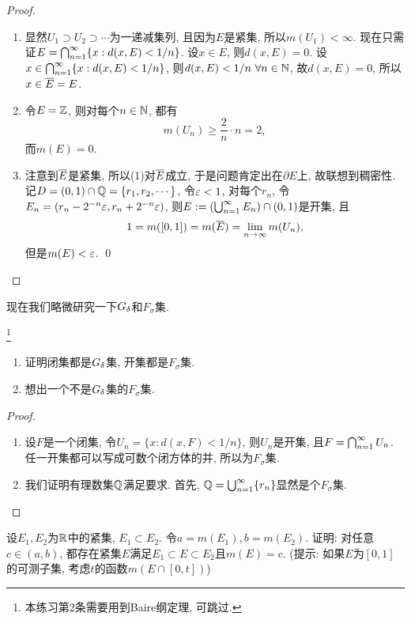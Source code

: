 \begin{proof}
    \begin{enumerate}
    \item 显然$U_1 \supset U_2 \supset \cdots$为一递减集列, 且因为$E$是紧集, 所以$m(U_1) < \infty$. 
    现在只需证$E = \bigcap_{n=1}^{\infty}\{x:d(x,E) < 1/n\}$. 设$x \in E$, 则$d(x,E)=0$. 设$x \in  \bigcap_{n=1}^{\infty}\{x:d(x,E) < 1/n\}$, 则$d(x,E) < 1/n~\forall n \in \mathbb{N}$, 故$d(x,E) = 0$, 所以$x \in \overline{E} = E$. 
    \item 令$E = \mathbb{Z}$, 则对每个$n \in \mathbb{N}$, 都有
    $$m(U_n) \geq \frac{2}{n} \cdot n = 2, $$
    而$m(E) = 0$. 
    \item 注意到$\overline{E}$是紧集, 所以(1)对$\overline{E}$成立, 于是问题肯定出在$\partial E$上, 故联想到稠密性. 记$D=(0,1) \cap \mathbb{Q} = \{r_1, r_2, \cdots\}$, 令$\varepsilon < 1$, 对每个$r_n$, 令$E_n = (r_n - 2^{-n}\varepsilon, r_n + 2^{-n}\varepsilon)$, 则$E := (\bigcup_{n=1}^{\infty}E_n) \cap (0,1)$是开集, 
    且$$ 1 = m([0,1]) = m(\overline{E}) = \lim_{n \to \infty}m(U_n), $$
    但是$m(E) < \varepsilon$. \qed 
    \end{enumerate}
\end{proof}

现在我们略微研究一下$G_\delta$和$F_\sigma$集.
\begin{exercise}\footnote{本练习第2条需要用到Baire纲定理, 可跳过.}
    \begin{enumerate}
    \item 证明闭集都是$G_\delta$集, 开集都是$F_\sigma$集.
    \item 想出一个不是$G_\delta$集的$F_\sigma$集.
    \end{enumerate}
\end{exercise}
\begin{proof}
    \begin{enumerate}
    \item 设$F$是一个闭集, 令$U_n = \{x: d(x,F) < 1/n\}$, 则$U_n$是开集, 且$F = \bigcap_{n=1}^{\infty}U_n$. 任一开集都可以写成可数个闭方体的并, 所以为$F_\sigma$集. 
    \item 我们证明有理数集$\mathbb{Q}$满足要求. 首先, $\mathbb{Q} = \bigcup_{n=1}^{\infty}\{r_n\}$显然是个$F_\sigma$集. 
    \end{enumerate}
\end{proof}
\begin{exercise} %
    设$E_1,E_2$为$\mathbb{R}$中的紧集, $E_1 \subset E_2$. 令$a = m(E_1), b = m(E_2)$. 
    证明: 对任意$c \in (a,b)$, 都存在紧集$E$满足$E_1 \subset E \subset E_2$且$m(E)=c$. 
    (提示: 如果$E$为$[0,1]$的可测子集, 考虑$t$的函数$m(E \cap [0,t])$)
\end{exercise}

